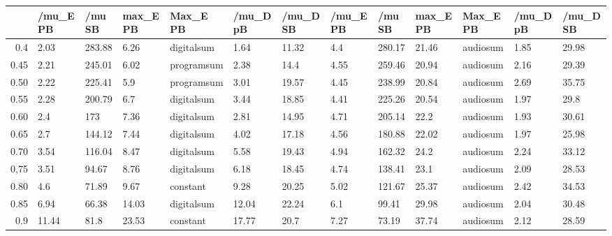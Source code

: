 \begin{table}[ht]
\centering
\begin{tabular}{rllllllllllll}
  \hline
 & /mu\_E PB & /mu SB & max\_E PB & Max\_E PB & /mu\_D pB & /mu\_D SB & /mu\_E PB & /mu SB & max\_E PB & Max\_E PB & /mu\_D pB & /mu\_D SB \\ 
  \hline
0.4 & 2.03 & 283.88 & 6.26 & digitalsum & 1.64 & 11.32 & 4.4 & 280.17 & 21.46 & audiosum & 1.85 & 29.98 \\ 
  0.45 & 2.21 & 245.01 & 6.02 & programsum & 2.38 & 14.4 & 4.55 & 259.46 & 20.94 & audiosum & 2.16 & 29.39 \\ 
  0.50 & 2.22 & 225.41 & 5.9 & programsum & 3.01 & 19.57 & 4.45 & 238.99 & 20.84 & audiosum & 2.69 & 35.75 \\ 
  0.55 & 2.28 & 200.79 & 6.7 & digitalsum & 3.44 & 18.85 & 4.41 & 225.26 & 20.54 & audiosum & 1.97 & 29.8 \\ 
  0.60 & 2.4 & 173 & 7.36 & digitalsum & 2.81 & 14.95 & 4.71 & 205.14 & 22.2 & audiosum & 1.93 & 30.61 \\ 
  0.65 & 2.7 & 144.12 & 7.44 & digitalsum & 4.02 & 17.18 & 4.56 & 180.88 & 22.02 & audiosum & 1.97 & 25.98 \\ 
  0.70 & 3.54 & 116.04 & 8.47 & digitalsum & 5.58 & 19.43 & 4.94 & 162.32 & 24.2 & audiosum & 2.24 & 33.12 \\ 
  0,75 & 3.51 & 94.67 & 8.76 & digitalsum & 6.18 & 18.45 & 4.74 & 138.41 & 23.1 & audiosum & 2.09 & 28.53 \\ 
  0.80 & 4.6 & 71.89 & 9.67 & constant & 9.28 & 20.25 & 5.02 & 121.67 & 25.37 & audiosum & 2.42 & 34.53 \\ 
  0.85 & 6.94 & 66.38 & 14.03 & digitalsum & 12.04 & 22.24 & 6.1 & 99.41 & 29.98 & audiosum & 2.04 & 30.48 \\ 
  0.9 & 11.44 & 81.8 & 23.53 & constant & 17.77 & 20.7 & 7.27 & 73.19 & 37.74 & audiosum & 2.12 & 28.59 \\ 
   \hline
\end{tabular}
\end{table}
